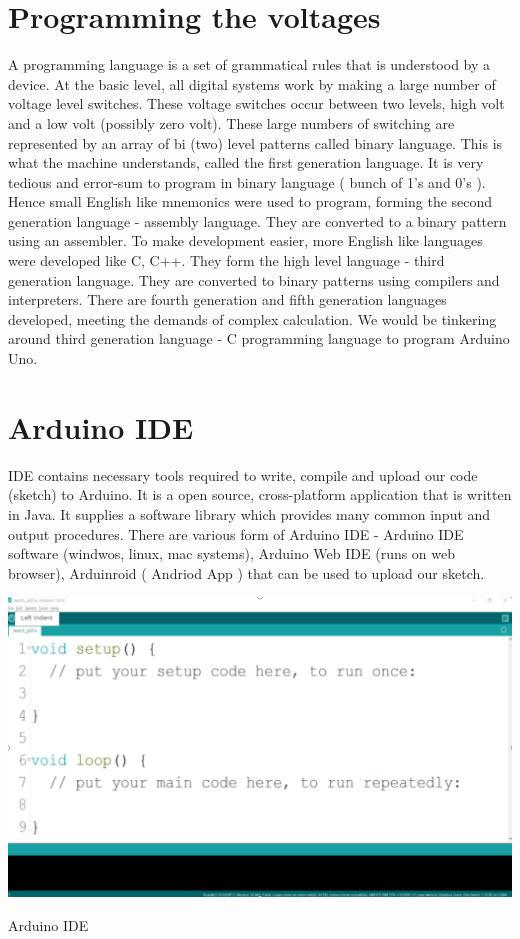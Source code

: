 \section{Programming the voltages}
\par A programming language is a set of grammatical rules that is understood by a device. At the basic level, all digital systems work by making a large number of voltage level switches. These voltage switches occur between two levels, high volt and a low volt (possibly zero volt). These large numbers of switching are represented by an array of bi (two) level patterns called binary language. This is what the machine understands, called the first generation language. It is very tedious and error-sum to program in binary language ( bunch of 1’s and 0’s ). Hence small English like mnemonics were used to program, forming the second generation language - assembly language. They are converted to a binary pattern using an assembler. To make development easier, more English like languages were developed like C, C++. They form the high level language - third generation language. They are converted to binary patterns using compilers and interpreters. There are fourth generation and fifth generation languages developed, meeting the demands of complex calculation. We would be tinkering around third generation language - C programming language to program Arduino Uno.

\section{Arduino IDE}


 \ac{IDE} contains necessary tools required to write, compile and upload our code (sketch) to Arduino. It is a open source, cross-platform application that is written in Java. It supplies a software library which provides many common input and output procedures. There are various form of Arduino \ac{IDE} - Arduino \ac{IDE} software (windwos, linux, mac systems), Arduino Web \ac{IDE} (runs on web browser), Arduinroid ( Andriod App ) that can be used to upload our sketch.

\begin{marginfigure}
	\raggedright
    \vspace{-4cm} \includegraphics{Images/Programing_Arduino/IDE_interface.png}
    \captionsetup{type=figure}
    \caption{Arduino IDE}
\end{marginfigure}

